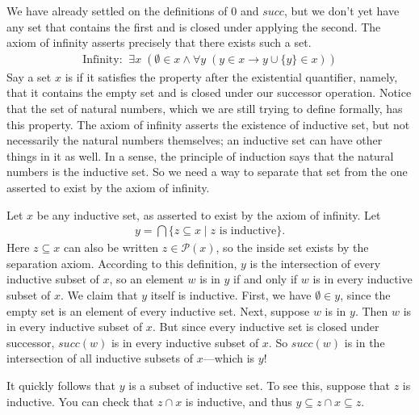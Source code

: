 \documentclass[letterpaper,10pt,english]{sphinxmanual}
\begin{document}
\sphinxAtStartPar
We have already settled on the definitions of \(0\) and \(\mathit{succ}\), but we don’t yet have any set that contains the first and is closed under applying the second. The axiom of infinity asserts precisely that there exists such a set.
\begin{equation*}
\begin{split}\text{Infinity:} \;\; \exists x \; (\emptyset \in x \wedge \forall y \; (y \in x \rightarrow y \cup \{ y \} \in x))\end{split}
\end{equation*}
\sphinxAtStartPar
Say a set \(x\) is  if it satisfies the property after the existential quantifier, namely, that it contains the empty set and is closed under our successor operation. Notice that the set of natural numbers, which we are still trying to define formally, has this property. The axiom of infinity asserts the existence of  inductive set, but not necessarily the natural numbers themselves; an inductive set can have other things in it as well. In a sense, the principle of induction says that the natural numbers is the  inductive set. So we need a way to separate that set from the one asserted to exist by the axiom of infinity.

\sphinxAtStartPar
Let \(x\) be any inductive set, as asserted to exist by the axiom of infinity. Let
\begin{equation*}
\begin{split}y = \bigcap \{ z \subseteq x \mid \mbox{$z$ is inductive} \}.\end{split}
\end{equation*}
\sphinxAtStartPar
Here \(z \subseteq x\) can also be written \(z \in \mathcal P(x)\), so the inside set exists by the separation axiom. According to this definition, \(y\) is the intersection of every inductive subset of \(x\), so an element \(w\) is in \(y\) if and only if \(w\) is in every inductive subset of \(x\). We claim that \(y\) itself is inductive. First, we have \(\emptyset \in y\), since the empty set is an element of every inductive set. Next, suppose \(w\) is in \(y\). Then \(w\) is in every inductive subset of \(x\). But since every inductive set is closed under successor, \(\mathit{succ}(w)\) is in every inductive subset of \(x\). So \(\mathit{succ}(w)\) is in the intersection of all inductive subsets of \(x\)—which is \(y\)!

\sphinxAtStartPar
It quickly follows that \(y\) is a subset of  inductive set. To see this, suppose that \(z\) is inductive. You can check that \(z \cap x\) is inductive, and thus \(y \subseteq z \cap x \subseteq z\).
\end{document}
